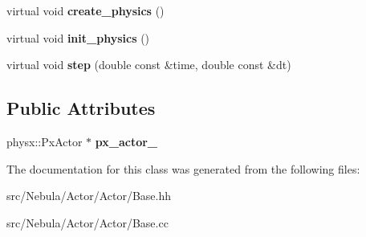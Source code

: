 \begin{DoxyCompactItemize}
\item 
\hypertarget{classNeb_1_1Actor_1_1Actor_1_1Base_ae514775e89a0c97b88c68a16dfba6796}{virtual void {\bfseries create\-\_\-physics} ()}\label{classNeb_1_1Actor_1_1Actor_1_1Base_ae514775e89a0c97b88c68a16dfba6796}

\item 
\hypertarget{classNeb_1_1Actor_1_1Actor_1_1Base_a7c88551377b004c027c92a752436d88e}{virtual void {\bfseries init\-\_\-physics} ()}\label{classNeb_1_1Actor_1_1Actor_1_1Base_a7c88551377b004c027c92a752436d88e}

\item 
\hypertarget{classNeb_1_1Actor_1_1Actor_1_1Base_a9d9e6ef9d0edc023a4fb56d6e09f229c}{virtual void {\bfseries step} (double const \&time, double const \&dt)}\label{classNeb_1_1Actor_1_1Actor_1_1Base_a9d9e6ef9d0edc023a4fb56d6e09f229c}

\end{DoxyCompactItemize}
\subsection*{\-Public \-Attributes}
\begin{DoxyCompactItemize}
\item 
\hypertarget{classNeb_1_1Actor_1_1Actor_1_1Base_adee942b9aabe682e47e9fbd6dd924e89}{physx\-::\-Px\-Actor $\ast$ {\bfseries px\-\_\-actor\-\_\-}}\label{classNeb_1_1Actor_1_1Actor_1_1Base_adee942b9aabe682e47e9fbd6dd924e89}

\end{DoxyCompactItemize}


\-The documentation for this class was generated from the following files\-:\begin{DoxyCompactItemize}
\item 
src/\-Nebula/\-Actor/\-Actor/\-Base.\-hh\item 
src/\-Nebula/\-Actor/\-Actor/\-Base.\-cc\end{DoxyCompactItemize}
